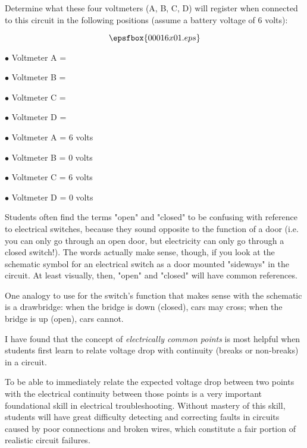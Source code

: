 

Determine what these four voltmeters (A, B, C, D) will register when connected to this circuit in the following positions (assume a battery voltage of 6 volts):

$$\epsfbox {00016x01.eps}$$

\medskip
\item{$\bullet$} Voltmeter A = 
\item{$\bullet$} Voltmeter B = 
\item{$\bullet$} Voltmeter C = 
\item{$\bullet$} Voltmeter D = 
\medskip







\medskip
\item{$\bullet$} Voltmeter A = 6 volts
\item{$\bullet$} Voltmeter B = 0 volts
\item{$\bullet$} Voltmeter C = 6 volts
\item{$\bullet$} Voltmeter D = 0 volts
\medskip







Students often find the terms "open" and "closed" to be confusing with reference to electrical switches, because they sound opposite to the function of a door (i.e. you can only go through an open door, but electricity can only go through a closed switch!).  The words actually make sense, though, if you look at the schematic symbol for an electrical switch as a door mounted "sideways" in the circuit.  At least visually, then, "open" and "closed" will have common references.

One analogy to use for the switch's function that makes sense with the schematic is a drawbridge: when the bridge is down (closed), cars may cross; when the bridge is up (open), cars cannot.

I have found that the concept of {\it electrically common points} is most helpful when students first learn to relate voltage drop with continuity (breaks or non-breaks) in a circuit.

To be able to immediately relate the expected voltage drop between two points with the electrical continuity between those points is a very important foundational skill in electrical troubleshooting.  Without mastery of this skill, students will have great difficulty detecting and correcting faults in circuits caused by poor connections and broken wires, which constitute a fair portion of realistic circuit failures.




